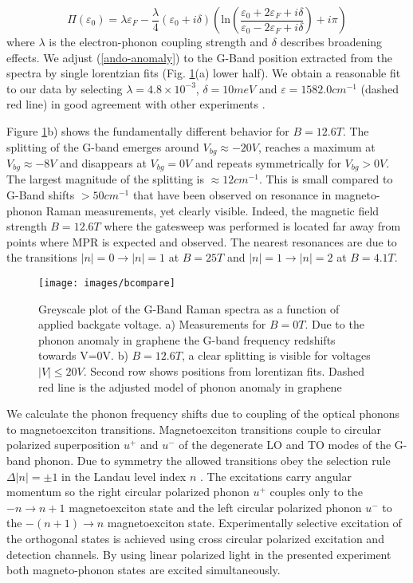 \documentclass[prl,aps,superscriptaddress,showpacs,reprint]{revtex4-1}
\begin{document}
\begin{equation}
\label{ando-anomaly}
\Pi(\varepsilon_0) = \lambda \varepsilon_F -\frac{\lambda}{4}\left(\varepsilon_0+i\delta\right)\left(\mathrm{ln}\left(\frac{\varepsilon_0+2\varepsilon_F+i\delta}{\varepsilon_0-2\varepsilon_F+i\delta}\right)+i\pi\right)
\end{equation}
where $\lambda$ is the electron-phonon coupling strength and $\delta$ describes broadening effects. We adjust (\ref{ando-anomaly}) to the G-Band position extracted from the spectra by single lorentzian fits (Fig. \ref{bcompare}(a) lower half). We obtain a reasonable fit to our data by selecting $\lambda = 4.8\times 10^{-3}$, $\delta=10meV$ and $\varepsilon=1582.0cm^{-1}$ (dashed red line) in good agreement with other experiments \cite{yan2007electric,pisana2007breakdown}.

Figure \ref{bcompare}b) shows the fundamentally different behavior for $B=12.6T$. The splitting of the G-band emerges around $V_{bg} \approx -20V$, reaches a maximum at $V_{bg} \approx -8V$ and disappears at $V_{bg} = 0V$ and repeats symmetrically for $V_{bg}>0V$. The largest magnitude of the splitting is $\approx 12cm^{-1}$. This is small compared to G-Band shifts $>50cm^{-1}$ that have been observed on resonance in magneto-phonon Raman measurements, yet clearly visible.
Indeed, the magnetic field strength $B=12.6T$ where the gatesweep was performed is located far away from points where MPR is expected and observed. The nearest resonances are due to the transitions $\left|n\right|=0 \rightarrow \left|n\right|=1$ at $B=25T$ and $\left|n\right|=1 \rightarrow \left|n\right|=2$ at $B=4.1T$. 
\begin{figure}[b]
   \texttt{[image: images/bcompare]}
   \caption{\label{bcompare}Greyscale plot of the G-Band Raman spectra as a function of applied backgate voltage. a) Measurements for $B=0T$. Due to the phonon anomaly in graphene the G-band frequency redshifts towards V=0V. b) $B=12.6T$, a clear splitting is visible for voltages $\left|V\right|\leq 20V$. Second row shows positions from lorentizan fits. Dashed red line is the adjusted model of phonon anomaly in graphene}
\end{figure}

We calculate the phonon frequency shifts due to coupling of the optical phonons to magnetoexciton transitions.
Magnetoexciton transitions couple to circular polarized superposition $u^+$ and $u^-$ of the degenerate LO and TO modes of the G-band phonon. Due to symmetry the allowed transitions obey the selection rule  $\Delta\left|n\right|=\pm 1$ in the Landau level index $n$  \cite{PhysRevB.84.235138}. The excitations carry angular momentum so the right circular polarized phonon $u^+$ couples only to the $-n\rightarrow n+1$ magnetoexciton state and the left circular polarized phonon $u^-$ to the $-(n+1)\rightarrow n$ magnetoexciton  state\cite{goerbig2007filling}. Experimentally selective excitation of the orthogonal states is achieved using cross circular polarized excitation and detection channels\cite{PhysRevLett.110.227402,kossacki2012circular}.
By using linear polarized light in the presented experiment both magneto-phonon states are excited simultaneously. 
\end{document}
